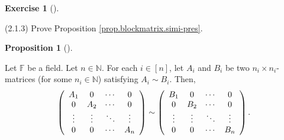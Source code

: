 \documentclass[numbers=enddot,12pt,final,onecolumn,notitlepage]{scrartcl}
\newcounter{exer}
\theoremstyle{definition}
\newtheorem{prop}[theo]{Proposition}
\newenvironment{proposition}[1][]
{\begin{prop}[#1]\begin{leftbar}}
        {\end{leftbar}\end{prop}}
\newtheorem{exmp}[exer]{Exercise}
\newenvironment{exercise}[1][]
{\begin{exmp}[#1]\begin{leftbar}}
        {\end{leftbar}\end{exmp}}
\begin{document}
\begin{exercise}
	\label{exe.blockmatrix.simi-pres} (2.1.3) Prove Proposition
	\ref{prop.blockmatrix.simi-pres}.

	\begin{proposition}
		\label{prop.blockmatrix.simi-pres}Let $\mathbb{F}$ be a field. Let
		$n\in\mathbb{N}$. For each $i\in\left[  n\right]  $, let $A_{i}$ and $B_{i}$
		be two $n_{i}\times n_{i}$-matrices (for some $n_{i}\in\mathbb{N}$) satisfying
		$A_{i}\sim B_{i}$. Then,%
		\[
			\left(
			\begin{array}
					[c]{cccc}%
					A_{1}  & 0      & \cdots & 0      \\
					0      & A_{2}  & \cdots & 0      \\
					\vdots & \vdots & \ddots & \vdots \\
					0      & 0      & \cdots & A_{n}  %
				\end{array}
			\right)  \sim\left(
			\begin{array}
					[c]{cccc}%
					B_{1}  & 0      & \cdots & 0      \\
					0      & B_{2}  & \cdots & 0      \\
					\vdots & \vdots & \ddots & \vdots \\
					0      & 0      & \cdots & B_{n}  %
				\end{array}
			\right)  .
		\]

	\end{proposition}
\end{exercise}
\end{document}
